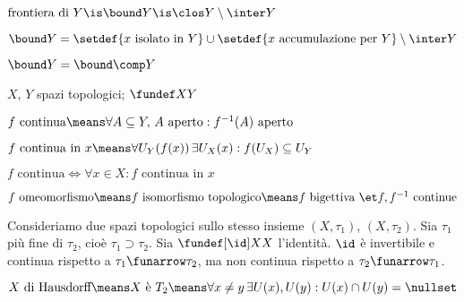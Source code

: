 \begin{defn}
$\text{frontiera di }Y\is\bound Y\is\clos Y\setminus\inter Y$
\end{defn}

\begin{prop}
$\bound Y=\setdef{x\text{ isolato in }Y}\cup\setdef{x\text{ accumulazione per }Y}\setminus\inter Y$
\end{prop}


\begin{prop}
$\bound Y=\bound\comp Y$
\end{prop}


$X$, $Y$ spazi topologici; $\fundef XY$

\begin{defn}[Continuità]
$f\text{ continua}\means\forall A\subseteq Y,\,A\text{ aperto}:f^{-1}(A)\text{ aperto}$
\end{defn}

\begin{defn}
$f\text{ continua in }x\means\forall U_Y(f(x))\,\exists U_X(x):f(U_X)\subseteq U_Y$
\end{defn}

\begin{prop}
$f\text{ continua}\iff\forall x\in X:f\text{ continua in }x$
\end{prop}

\begin{defn}
$f\text{ omeomorfismo}\means f\text{ isomorfismo topologico}\means f\text{ bigettiva }\et f, f^{-1}\text{ continue}$
\end{defn}

\begin{es}
Consideriamo due spazi topologici sullo stesso insieme $(X,\tau_1)$, $(X,\tau_2)$. Sia $\tau_1$ più fine di $\tau_2$, cioè $\tau_1\supset\tau_2$. Sia $\fundef[\id]XX$ l'identità. $\id$ è invertibile e continua rispetto a $\tau_1\funarrow\tau_2$, ma non continua rispetto a $\tau_2\funarrow\tau_1$.
\end{es}


\begin{defn}
$X\text{ di Hausdorff}\means X\text{ è }T_2\means\forall x\neq y\,\exists U(x),U(y):U(x)\cap U(y)=\nullset$
\end{defn}

